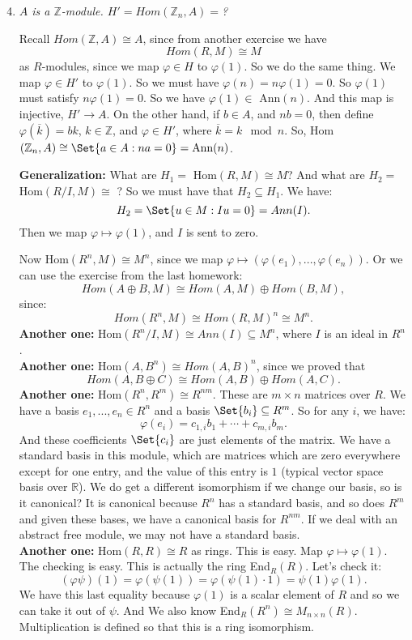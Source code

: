 \documentclass[9pt,reqno,twoside]{amsbook}
\theoremstyle{plain}
\numberwithin{section}{chapter}
\numberwithin{equation}{chapter}
\theoremstyle{definition}
\theoremstyle{remark}
\theoremstyle{plain}
\newcommand{\sub}{\subseteq}
\newcommand{\R}{\mathbb{R}}
\newcommand{\z}{\mathbb{Z}}
\renewcommand{\phi}{\varphi}
\begin{document}
\begin{enumerate}[label=\arabic*.]

\setcounter{enumi}{3}
\item \textit{$A$ is a $\z$-module. $H' =Hom(\z_n,A) = $?}

Recall $Hom(\z,A) \cong A$, since from another exercise we have 
$$
Hom(R,M) \cong M
$$
 as $R$-modules, since we map $\phi \in H$ to $\phi(1)$. So we do the same thing. We map $\phi \in H'$ to $\phi(1)$. So we must have $\phi(n) = n\phi(1) = 0$. So $\phi(1)$ must satisfy $n\phi(1) = 0$. So we have $\phi(1) \in $ Ann$(n)$. And this map is injective, $H' \to A$. On the other hand, if $b \in A$, and $nb = 0$, then define $\phi(\overline{k}) = bk$, $k \in \z$, and $\phi \in H'$, where $\overline{k} = k \mod n$. So, Hom$(\z_n,A) \cong \Set{a \in A: na = 0} = \text{Ann}(n)$. 

\textbf{Generalization: }What are $H_1 =$ Hom$(R,M) \cong M$? And what are $H_2 =$ Hom$(R/I,M) \cong$ ? So we must have that $H_2 \sub H_1$. We have: 
$$
H_2 = \Set{u \in M: Iu = 0} = Ann(I). 
$$
Then we map $\phi \mapsto \phi(1)$, and $I$ is sent to zero. 

Now Hom$(R^n,M) \cong M^n$, since we map $\phi \mapsto (\phi(e_1),...,\phi(e_n))$. Or we can use the exercise from the last homework:
$$
Hom(A \oplus B,M) \cong Hom(A,M) \oplus Hom(B,M),
$$
since:
$$
Hom(R^n,M) \cong Hom(R,M)^n \cong M^n.
$$
\textbf{Another one:} Hom$(R^n/I,M) \cong Ann(I) \sub M^n$, where $I$ is an ideal in $R^n$. \\
\textbf{Another one:} Hom$(A,B^n) \cong Hom(A,B)^n$, since we proved that 
$$Hom(A,B \oplus C) \cong Hom(A,B) \oplus Hom(A,C).
$$
\textbf{Another one:} Hom$(R^n,R^m) \cong R^{nm}$. These are $m \times n$ matrices over $R$. We have a basis $e_1,...,e_n \in R^n$ and a basis $\Set{b_i} \sub R^m$. So for any $i$, we have:
$$
\phi(e_i) = c_{1,i}b_1 + \cdots + c_{m,i}b_m.
$$ 
And these coefficients $\Set{c_i}$ are just elements of the matrix. We have a standard basis in this module, which are matrices which are zero everywhere except for one entry, and the value of this entry is $1$ (typical vector space basis over $\R$). We do get a different isomorphism if we change our basis, so is it canonical? It is canonical because $R^n$ has a standard basis, and so does $R^m$ and given these bases, we have a canonical basis for $R^{nm}$. If we deal with an abstract free module, we may not have a standard basis. \\
\textbf{Another one: }Hom$(R,R) \cong R$ as rings. This is easy. Map $\phi \mapsto \phi(1)$. The checking is easy. This is actually the ring End$_R(R)$. Let's check it: 
$$
(\phi\psi)(1) = \phi(\psi(1)) = \phi(\psi(1)\cdot 1) = \psi(1) \phi(1).
$$
We have this last equality because $\phi(1)$ is a scalar element of $R$ and so we can take it out of $\psi$. And We also know End$_R(R^n) \cong M_{n \times n}(R)$. Multiplication is defined so that this is a ring isomorphism. 


\end{enumerate}
\end{document}
